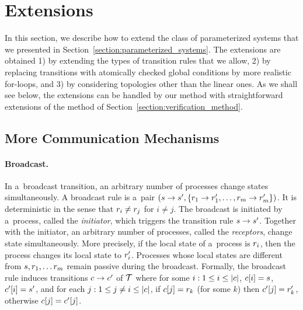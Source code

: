 %
\section{Extensions}
\label{section:extensions}
In this section, we describe how to extend the class of parameterized
systems that we presented in
Section~\ref{section:parameterized_systems}.
%
The extensions are obtained 
1) by extending the types of transition rules that we allow, 
2) by replacing transitions with atomically checked global conditions by more realistic for-loops, and
3) by considering topologies other than the linear ones. 
% 
As we shall see below, the extensions can be handled by our method
with straightforward extensions of the method of
Section~\ref{section:verification_method}.


\subsection{More Communication Mechanisms}

\paragraph{Broadcast.}
\label{section:broadcast}
In a~broadcast transition, an arbitrary number of processes change
states simultaneously. A broadcast rule is a~pair 
$(s\rightarrow s',\{r_1\rightarrow r_1',\ldots,r_m\rightarrow r_m'\})$.
%
It is deterministic in the sense that 
$r_i\neq r_j$ for $i\neq j$.
%
The broadcast is initiated by a~process, 
called the \emph{initiator}, 
which triggers the transition 
rule $s\rightarrow s'$. 
%
Together with the initiator, an arbitrary number of processes, 
called
the \emph{receptors}, change state simultaneously.
%
More precisely, if the local
state of a~process is $r_i$, then the process changes
its local state to $r_i'$. 
%
Processes whose local states are different from
$s,r_1,\ldots r_m$ remain passive during the broadcast.
%
Formally, the broadcast rule induces transitions $c\rightarrow c'$
of ${\mathcal T}$ where for some $i:1\leq i\leq |c|$, $c[i]=s$,
$c'[i]=s'$, and for each $j:1\leq j\neq i \leq |c|$, if
$c[j] = r_k$ (for some $k$) then $c'[j] = r_k'$,
otherwise $c[j]=c'[j]$.
%

